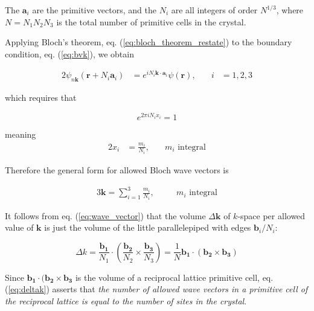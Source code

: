 	The $\boldsymbol{a}_i$ are the primitive vectors, and the $N_i$ are all integers of order $N^{1/3}$, where $N=N_1N_2N_3$ is the total number of primitive cells in the crystal.

	Applying Bloch's theorem, eq. (\ref{eq:bloch_theorem_restate}) to the boundary condition, eq. (\ref{eq:bvk}),  we obtain

	\begin{alignat}{2}\label{eq:bloch_applied}
		\psi_{n\boldsymbol{k}}
		(\boldsymbol{r} + N_i \boldsymbol{a}_i)
		&= 
		e^{i N_i \boldsymbol{k} \cdot \boldsymbol{a}_i}
		\psi(\boldsymbol{r}),
		&\quad
		i &= 1,2,3
	\end{alignat}

	which requires that

	\begin{equation} \label{eq:requirement}
		e^{2 \pi i N_i x_i} = 1
	\end{equation}

	meaning
	\begin{alignat}{2} \label{eq:xi}
		x_i &= \frac{m_i}{N_i},
		& \quad
		m_i\text{ integral}
	\end{alignat}


	Therefore the general form for allowed Bloch wave vectors is

	\begin{alignat}{3} \label{eq:wave_vector}
		\boldsymbol{k} =
		\sum_{i=1}^{3} \frac{m_i}{N_i},
		&\quad 
		&m_i\text{ integral}
	\end{alignat}

	It follows from eq. (\ref{eq:wave_vector}) that the volume $\Delta\boldsymbol{k}$ of $k$-space per allowed value of $\boldsymbol{k}$ is just the volume of the little parallelepiped with edges $\boldsymbol{b}_i/N_i$:

	\begin{equation} \label{eq:deltak}
		\Delta{k}
		= 
		\frac{\boldsymbol{b_1}}{N_1}
		\cdot
		\left(
		\frac{\boldsymbol{b_2}}{N_2}
		\times
		\frac{\boldsymbol{b_3}}{N_3}
		\right)
		=
		\frac{1}{N}
		\boldsymbol{b_1}
		\cdot
		\left(
		\boldsymbol{b_2}
		\times
		\boldsymbol{b_3}
		\right)
	\end{equation}

	Since $\boldsymbol{b_1} \cdot (\boldsymbol{b_2} \times \boldsymbol{b_3}$ is the volume of a reciprocal lattice primitive cell, eq. (\ref{eq:deltak}) asserts that \emph{the number of allowed wave vectors in a primitive cell of the reciprocal lattice is equal to the number of sites in the crystal}.

